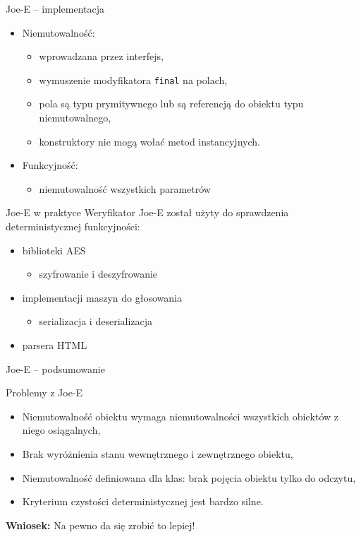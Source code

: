\documentclass[handout]{beamer}
\begin{document}
\begin{frame}{Joe-E -- implementacja}
  \begin{itemize}
  \item Niemutowalność:
    \begin{itemize}
    \item wprowadzana przez interfejs, 
    \item wymuszenie modyfikatora \texttt{final} na polach, 
    \item pola są typu prymitywnego lub są referencją do 
      obiektu typu niemutowalnego, 
    \item konstruktory nie mogą wołać metod instancyjnych. 
  \end{itemize}
  \item Funkcyjność:
    \begin{itemize}
      \item niemutowalność wszystkich parametrów
    \end{itemize}
  \end{itemize}
\end{frame}

\begin{frame}{Joe-E w praktyce}
  Weryfikator Joe-E został użyty do sprawdzenia deterministycznej
  funkcyjności:
  \begin{itemize}
  \item<1-> biblioteki AES
    \begin{itemize}
      \item szyfrowanie i deszyfrowanie
    \end{itemize}
  \item<2-> implementacji maszyn do głosowania 
    \begin{itemize}
      \item serializacja i deserializacja
    \end{itemize}
  \item<3-> parsera HTML
  \end{itemize}
\end{frame}

\begin{frame}{Joe-E -- podsumowanie}
  \begin{alertblock}{Problemy z Joe-E}
    \begin{itemize} 
    \item<1-> Niemutowalność obiektu wymaga niemutowalności wszystkich
      obiektów z niego osiągalnych, 
    \item<1-> Brak wyróżnienia stanu wewnętrznego i zewnętrznego obiektu, 
    \item<2-> Niemutowalność definiowana dla klas: brak pojęcia obiektu
      tylko do odczytu, 
    \item<3-> Kryterium czystości deterministycznej jest bardzo silne. 
    \end{itemize}
  \end{alertblock}
  \pause
  \begin{beamerboxesrounded}[upper=gr, lower=lgr, shadow=true]{\bf Wniosek:}
    Na pewno da się zrobić to lepiej!
  \end{beamerboxesrounded}
\end{frame}
\end{document}
